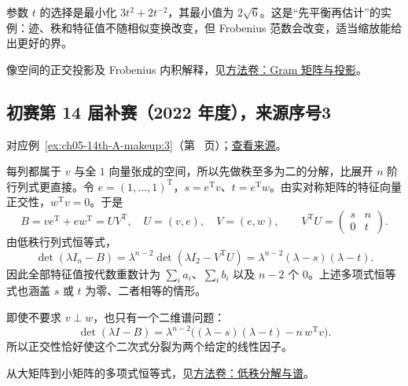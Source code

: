 \documentclass[UTF8,12pt,a4paper,fontset=fandol]{ctexart}
\begin{document}
\begin{remark}[方法与条件]

参数 $t$ 的选择是最小化 $3t^2+2t^{-2}$，其最小值为 $2\sqrt6$。这是“先平衡再估计”的实例：迹、秩和特征值不随相似变换改变，但 Frobenius 范数会改变，适当缩放能给出更好的界。

像空间的正交投影及 Frobenius 内积解释，见\hyperref[app:linear-gram]{方法卷：Gram 矩阵与投影}。

\end{remark}

\subsection{初赛第 14 届补赛（2022 年度），来源序号3}\label{ans:ch05-14th-A-makeup:3}\label{pr:ch05-14th-A-makeup:3}

对应例~\ref{ex:ch05-14th-A-makeup:3}（第~\pageref{ex:ch05-14th-A-makeup:3} 页）；\href{https://github.com/lzxcr/cmc-mathematics/blob/64916fa1fdbc3e444a652eca204d5669058ee321/src/problems/preliminary/14-makeup/03.md}{查看来源}。

\begin{solve}

每列都属于 $v$ 与全 $1$ 向量张成的空间，所以先做秩至多为二的分解，比展开 $n$ 阶行列式更直接。令 $e=(1,\ldots,1)^{\mathrm T}$，$s=e^{\mathrm T}v$、$t=e^{\mathrm T}w$。由实对称矩阵的特征向量正交性，$w^{\mathrm T}v=0$。于是
\[
B=ve^{\mathrm T}+ew^{\mathrm T}=UV^{\mathrm T},
\quad U=(v,e),\quad V=(e,w),
\qquad
V^{\mathrm T}U=\begin{pmatrix}s&n\\0&t\end{pmatrix}.
\]
由低秩行列式恒等式，
\[
\det(\lambda I_n-B)
=\lambda^{n-2}\det(\lambda I_2-V^{\mathrm T}U)
=\lambda^{n-2}(\lambda-s)(\lambda-t).
\]
因此全部特征值按代数重数计为 $\sum_i a_i$、$\sum_i b_i$ 以及 $n-2$ 个 $0$。上述多项式恒等式也涵盖 $s$ 或 $t$ 为零、二者相等的情形。

\end{solve}

\begin{remark}[方法与条件]

即使不要求 $v\perp w$，也只有一个二维谱问题：
\[
\det(\lambda I-B)=\lambda^{n-2}
\bigl((\lambda-s)(\lambda-t)-n\,w^{\mathrm T}v\bigr).
\]
所以正交性恰好使这个二次式分裂为两个给定的线性因子。

从大矩阵到小矩阵的多项式恒等式，见\hyperref[app:linear-lowrank]{方法卷：低秩分解与谱}。

\end{remark}
\end{document}
